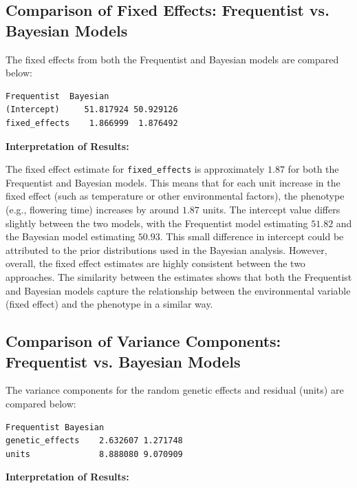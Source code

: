 \documentclass[12pt,a4paper]{article}
\begin{document}
\subsection{Comparison of Fixed Effects: Frequentist vs. Bayesian Models}

The fixed effects from both the Frequentist and Bayesian models are compared below:

\begin{verbatim}
Frequentist  Bayesian
(Intercept)     51.817924 50.929126
fixed_effects    1.866999  1.876492
\end{verbatim}

\textbf{Interpretation of Results:}

The fixed effect estimate for \texttt{fixed\_effects} is approximately \(1.87\) for both the Frequentist and Bayesian models. This means that for each unit increase in the fixed effect (such as temperature or other environmental factors), the phenotype (e.g., flowering time) increases by around \(1.87\) units. The intercept value differs slightly between the two models, with the Frequentist model estimating \(51.82\) and the Bayesian model estimating \(50.93\). This small difference in intercept could be attributed to the prior distributions used in the Bayesian analysis. However, overall, the fixed effect estimates are highly consistent between the two approaches. The similarity between the estimates shows that both the Frequentist and Bayesian models capture the relationship between the environmental variable (fixed effect) and the phenotype in a similar way.

\subsection{Comparison of Variance Components: Frequentist vs. Bayesian Models}

The variance components for the random genetic effects and residual (units) are compared below:

\begin{verbatim}
Frequentist Bayesian
genetic_effects    2.632607 1.271748
units              8.888080 9.070909
\end{verbatim}

\textbf{Interpretation of Results:}
\end{document}
